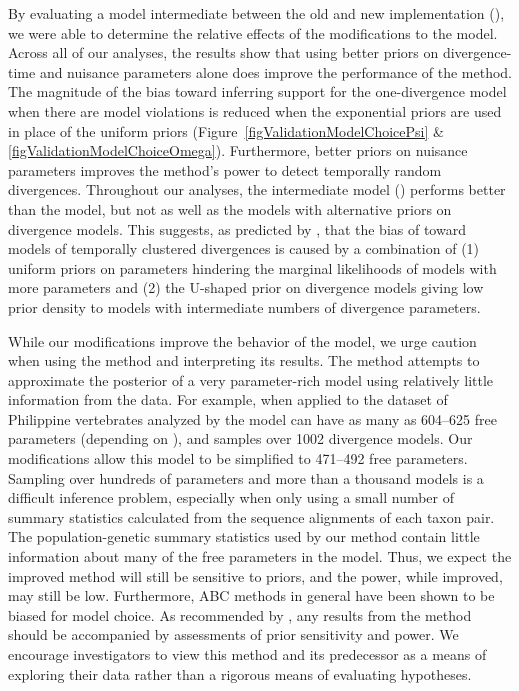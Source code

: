 By evaluating a model intermediate between the old and new implementation
(\modelUshaped), we were able to determine the relative effects of the
modifications to the model.
Across all of our analyses, the results show that using better priors on
divergence-time and nuisance parameters alone does improve the performance of
the method.
The magnitude of the bias toward inferring support for the one-divergence
model when there are model violations is reduced when the exponential
priors are used in place of the uniform priors
(Figure~\ref{figValidationModelChoicePsi} \&
\ref{figValidationModelChoiceOmega}).
Furthermore, better priors on nuisance parameters improves the method's
power to detect temporally random divergences.
Throughout our analyses, the intermediate model (\modelUshaped) performs
better than the \msb model, but not as well as the models with alternative
priors on divergence models.
This suggests, as predicted by \citet{Oaks2012}, that the bias of \msb toward
models of temporally clustered divergences is caused by a combination of
(1) uniform priors on parameters hindering the marginal likelihoods of models
with more \divTime{} parameters and
(2) the U-shaped prior on divergence models giving low prior density to models
with intermediate numbers of divergence parameters.

While our modifications improve the behavior of the model, we urge
caution when using the method and interpreting its results.
The method attempts to approximate the posterior of a very parameter-rich model
using relatively little information from the data.
For example, when applied to the dataset of Philippine vertebrates analyzed by
\citet{Oaks2012} the model can have as many as 604--625 free parameters
(depending on \divTimeNum), and samples over 1002 divergence models.
Our modifications allow this model to be simplified to 471--492 free
parameters.
Sampling over hundreds of parameters and more than a thousand models is a
difficult inference problem, especially when only using a small number of
summary statistics calculated from the sequence alignments of each taxon pair.
The population-genetic summary statistics used by our method contain little
information about many of the free parameters in the model.
Thus, we expect the improved method will still be sensitive to priors, and the
power, while improved, may still be low.
Furthermore, ABC methods in general have been shown to be biased
\citep{Robert2011} for model choice.
As recommended by \citet{Oaks2012}, any results from the method should be
accompanied by assessments of prior sensitivity and power.
We encourage investigators to view this method and its predecessor as a means
of exploring their data rather than a rigorous means of evaluating hypotheses.

